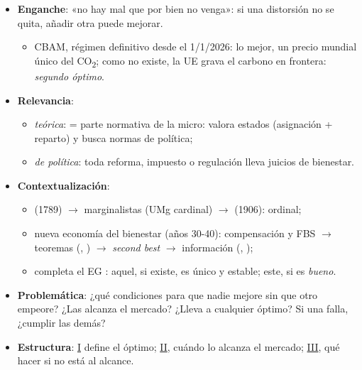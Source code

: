 \documentclass{article}
\begin{document}
\cabecerarepaso
\begin{columnas}

\begin{itemize}
\item \textbf{Enganche}: «no hay mal que por bien no venga»: si una distorsión no se quita, añadir otra puede mejorar.
  \begin{itemize}
  \item CBAM, régimen definitivo desde el 1/1/2026: lo mejor, un precio mundial único del CO\textsubscript{2}; como no existe, la UE grava el carbono en frontera: \emph{segundo óptimo}.
  \end{itemize}
\item \textbf{Relevancia}:
  \begin{itemize}
  \item \emph{teórica}:  = parte normativa de la micro: valora estados (asignación + reparto) y busca normas de política;
  \item \emph{de política}: toda reforma, impuesto o regulación lleva juicios de bienestar.
  \end{itemize}
\item \textbf{Contextualización}:
  \begin{itemize}
  \item {} (1789) $\to$ marginalistas (UMg cardinal) $\to$  (1906): ordinal;
  \item nueva economía del bienestar (años 30-40): compensación y FBS $\to$ teoremas (, ) $\to$ \emph{second best} $\to$ información (, );
  \item completa el EG : aquel, si existe, es único y estable; este, si es \emph{bueno}.
  \end{itemize}
\item \textbf{Problemática}: ¿qué condiciones para que nadie mejore sin que otro empeore? ¿Las alcanza el mercado? ¿Lleva a cualquier óptimo? Si una falla, ¿cumplir las demás?
\item \textbf{Estructura}: \hyperref[rep:I]{I} define el óptimo; \hyperref[rep:II]{II}, cuándo lo alcanza el mercado; \hyperref[rep:III]{III}, qué hacer si no está al alcance.
\end{itemize}


\end{columnas}
\end{document}
